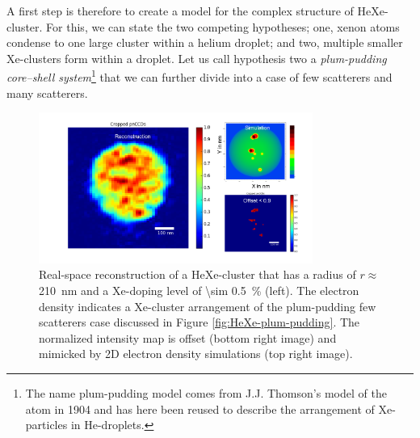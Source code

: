 %
A first step is therefore to create a model for the complex structure of HeXe-cluster. For this, we can state the two competing hypotheses; one, xenon atoms condense to one large cluster within a helium droplet; and two, multiple smaller Xe-clusters form within a droplet. Let us call hypothesis two a \textit{plum-pudding core--shell system}\footnote{The name plum-pudding model comes from J.J. Thomson's model of the atom in 1904 and has here been reused to describe the arrangement of Xe-particles in He-droplets.} that we can further divide into a case of few scatterers and many scatterers.\\[1\baselineskip]
%
\begin{figure}
 	\centering
 		\includegraphics[width=0.80\textwidth]{images/results/reconstructions-to-simulations.png}
 	\caption[Reconstruction of HeXe-clusters and simulated electron densities.]{Real-space reconstruction of a HeXe-cluster that has a radius of $r\approx$ \SI{210}{\nano\meter} and a Xe-doping level of \SI{\sim 0.5}{\percent} (left). The electron density indicates a Xe-cluster arrangement of the plum-pudding few scatterers case discussed in Figure \ref{fig:HeXe-plum-pudding}. The normalized intensity map is offset (bottom right image) and mimicked by 2D electron density simulations (top right image).}
 	\label{fig:HeXe-cluster-60}
\end{figure}

